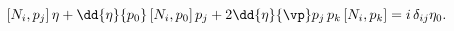 \begin{equation}\label{20}
[N_i, p_j]\, \eta + \dd{\eta}{p_0}\, [N_i, p_0]\, p_j+ 2 \dd{\eta}{\vp} p_j\,
p_k\, [N_i, p_k] = i\, \delta_{ij} \eta_0.
\end{equation}

